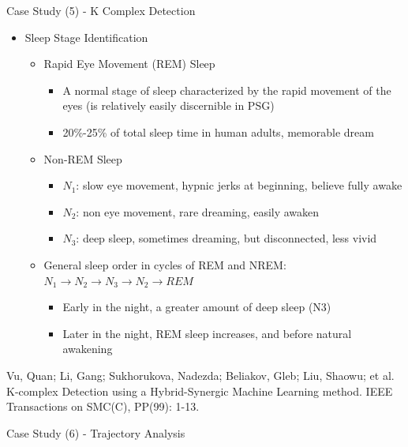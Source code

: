 \documentclass[
 size=14pt,
 paper=smartboard,  %
 mode=present, 		%
 display=slides, 	%
 style=tuliplab,  	%
 pauseslide,
 fleqn,leqno]{powerdot}
\begin{document}
\begin{slide}[toc=,bm=]{Case Study (5) - K Complex Detection}
\begin{itemize}
\item Sleep Stage Identification
\begin{itemize}
\item<2->
Rapid Eye Movement (REM) Sleep
\begin{itemize}
\item<2->
A normal stage of sleep characterized by the rapid movement of the eyes  
(is relatively easily discernible in PSG)
\item<2->
20\%-25\% of total sleep time in human adults, memorable dream
\end{itemize}
\item<3->
{Non-REM Sleep}
\begin{itemize}
\item<3->
\textbf{$N_1$}: slow eye movement, hypnic jerks at beginning, believe fully awake
\item<3->
\textbf{$N_2$}: non eye movement, rare dreaming, easily awaken
\item<3->
\textbf{$N_3$}: deep sleep, sometimes dreaming, but disconnected, less vivid
\end{itemize}
\item<4->
General sleep order in cycles of REM and NREM: 
$N_1 \rightarrow N_2 \rightarrow N_3 \rightarrow N_2 \rightarrow REM$
\begin{itemize}
\item<4->
Early in the night, a greater amount of deep sleep (N3)
\item<4->
Later in the night, REM sleep increases, and before natural awakening
\end{itemize}
\end{itemize}
\end{itemize}
\footnotesize{Vu, Quan; Li, Gang; Sukhorukova, Nadezda; 
Beliakov, Gleb; Liu, Shaowu; et al. 
K-complex Detection using a Hybrid-Synergic Machine Learning method. 
IEEE Transactions on SMC(C), PP(99): 1-13.}
\end{slide}


\begin{slide}[toc=,bm=]{Case Study (6) - Trajectory Analysis}


\end{slide}
\end{document}
